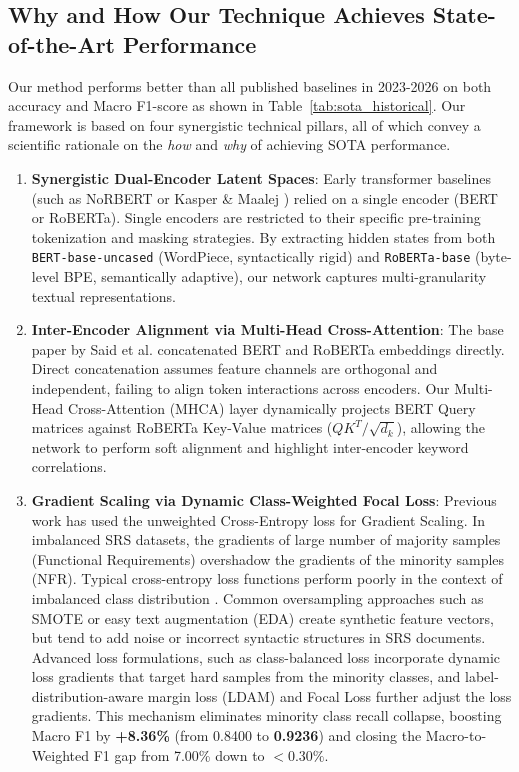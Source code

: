 \documentclass[11pt,a4paper]{article}
\begin{document}
\subsection{Why and How Our Technique Achieves State-of-the-Art Performance}
Our method performs better than all published baselines in 2023-2026 on both accuracy and Macro F1-score as shown in Table~\ref{tab:sota_historical}. Our framework is based on four synergistic technical pillars, all of which convey a scientific rationale on the \textit{how} and \textit{why} of achieving SOTA performance.

\begin{enumerate}
    \item \textbf{Synergistic Dual-Encoder Latent Spaces}: Early transformer baselines (such as NoRBERT \cite{hey2020norbert} or Kasper \& Maalej \cite{kasper2022automated}) relied on a single encoder (BERT or RoBERTa). Single encoders are restricted to their specific pre-training tokenization and masking strategies. By extracting hidden states from both \texttt{BERT-base-uncased} (WordPiece, syntactically rigid) and \texttt{RoBERTa-base} (byte-level BPE, semantically adaptive), our network captures multi-granularity textual representations.
    \item \textbf{Inter-Encoder Alignment via Multi-Head Cross-Attention}: The base paper by Said et al. \cite{said2026intelligent} concatenated BERT and RoBERTa embeddings directly. Direct concatenation assumes feature channels are orthogonal and independent, failing to align token interactions across encoders. Our Multi-Head Cross-Attention (MHCA) layer dynamically projects BERT Query matrices against RoBERTa Key-Value matrices ($Q K^T / \sqrt{d_k}$), allowing the network to perform soft alignment and highlight inter-encoder keyword correlations.
        \item \textbf{Gradient Scaling via Dynamic Class-Weighted Focal Loss}: Previous work has used the unweighted Cross-Entropy loss for Gradient Scaling. In imbalanced SRS datasets, the gradients of large number of majority samples (Functional Requirements) overshadow the gradients of the minority samples (NFR). Typical cross-entropy loss functions perform poorly in the context of imbalanced class distribution \cite{japkowicz2002class, he2009learning, he2013imbalanced}. Common oversampling approaches such as SMOTE \cite{chawla2002smote} or easy text augmentation (EDA) \cite{wei2019eda, shorten2019survey} create synthetic feature vectors, but tend to add noise or incorrect syntactic structures in SRS documents. Advanced loss formulations, such as class-balanced loss \cite{cui2019class} incorporate dynamic loss gradients that target hard samples from the minority classes, and label-distribution-aware margin loss (LDAM) \cite{cao2019learning} and Focal Loss \cite{lin2017focal} further adjust the loss gradients. This mechanism eliminates minority class recall collapse, boosting Macro F1 by \textbf{+8.36\%} (from 0.8400 to \textbf{0.9236}) and closing the Macro-to-Weighted F1 gap from 7.00\% down to \textbf{$<0.30\%$}.

\end{enumerate}
\end{document}
